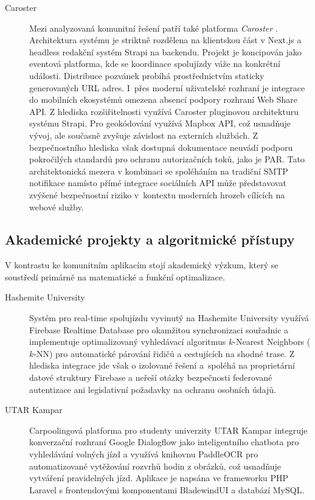 \documentclass[male,czech,api_bc]{kitheses}
\begin{document}
\begin{description}
\item[Caroster] Mezi analyzovaná komunitní řešení patří také platforma \textit{Caroster} \cite{Caroster2026}. Architektura systému je striktně rozdělena na klientskou část v Next.js a headless redakční systém Strapi na backendu. Projekt je koncipován jako eventová platforma, kde se koordinace spolujízdy váže na konkrétní události. Distribuce pozvánek probíhá prostřednictvím staticky generovaných URL adres. I~přes moderní uživatelské rozhraní je integrace do mobilních ekosystémů omezena absencí podpory rozhraní Web Share API. Z hlediska rozšiřitelnosti využívá Caroster pluginovou architekturu systému Strapi. Pro geokódování využívá Mapbox API, což usnadňuje vývoj, ale současně zvyšuje závislost na externích službách. Z bezpečnostního hlediska však dostupná dokumentace neuvádí podporu pokročilých standardů pro ochranu autorizačních toků, jako je PAR. Tato architektonická mezera v kombinaci se spoléháním na tradiční SMTP notifikace namísto přímé integrace sociálních API může představovat zvýšené bezpečnostní riziko v~kontextu moderních hrozeb cílících na webové služby.

\end{description}

\subsection{Akademické projekty a algoritmické přístupy}
\label{subsec:akademicke_projekty}

V kontrastu ke komunitním aplikacím stojí akademický výzkum, který se soustředí 
primárně na matematické a funkční optimalizace.

\begin{description}

\item[Hashemite University] Systém pro real-time spolujízdu vyvinutý na Hashemite University \cite{Salhi2019} využívá Firebase Realtime Database pro okamžitou synchronizaci souřadnic a implementuje optimalizovaný vyhledávací algoritmus $k$-Nearest Neighbors ($k$-NN) pro automatické párování řidičů a cestujících na shodné trase. Z hlediska integrace jde však o izolované řešení a~spoléhá na proprietární datové struktury Firebase a neřeší otázky bezpečnosti federované autentizace ani legislativní požadavky na ochranu osobních údajů.

\item[UTAR Kampar] Carpoolingová platforma pro studenty univerzity UTAR Kampar \cite{Tan2025} integruje konverzační rozhraní Google Dialogflow jako inteligentního chatbota pro vyhledávání volných jízd a využívá knihovnu PaddleOCR pro automatizované vytěžování rozvrhů hodin z obrázků, což usnadňuje vytváření pravidelných jízd. Aplikace je napsána ve frameworku PHP Laravel s frontendovými komponentami BladewindUI a databází MySQL.

\end{description}
\end{document}
